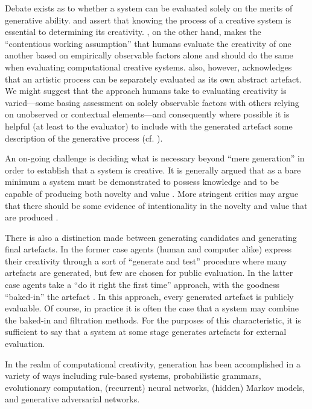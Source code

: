 \documentclass[phd,electronic,oneside,twosidetoc,letterpaper,chaptercenter,parttop,lol,lof,lot]{byumsphd}
\begin{document}
Debate exists as to whether a system can be evaluated solely on the merits of generative ability. \cite{Boden2003TheEdition} and \cite{kasof1995explaining} assert that knowing the process of a creative system is essential to determining its creativity. \citet{Ritchie2007}, on the other hand, makes the ``contentious working assumption'' that humans evaluate the creativity of one another based on empirically observable factors alone and should do the same when evaluating computational creative systems. \citeauthor{Ritchie2007} also, however, acknowledges that an artistic process can be separately evaluated as its own abstract artefact. We might suggest that the approach humans take to evaluating creativity is varied---some basing assessment on solely observable factors with others relying on unobserved or contextual elements---and consequently where possible it is helpful (at least to the evaluator) to include with the generated artefact some description of the generative process (cf. \cite{Colton2008CreativitySystems}).

An on-going challenge is deciding what is necessary beyond ``mere generation'' in order to establish that a system is creative. It is generally argued that as a bare minimum a system must be demonstrated to possess knowledge and to be capable of producing both novelty and value \citep{Boden2003TheEdition}. More stringent critics may argue that there should be some evidence of intentionality in the novelty and value that are produced \citep{Ventura2017HowSystem}.

There is also a distinction made between generating candidates and generating final artefacts. In the former case agents (human and computer alike) express their creativity through a sort of ``generate and test'' procedure where many artefacts are generated, but few are chosen for public evaluation. In the latter case agents take a ``do it right the first time'' approach, with the goodness ``baked-in'' the artefact \citep{Ventura2016}. In this approach, every generated artefact is publicly evaluable. Of course, in practice it is often the case that a system may combine the baked-in and filtration methods. For the purposes of this characteristic, it is sufficient to say that a system at some stage generates artefacts for external evaluation.

In the realm of computational creativity, generation has been accomplished in a variety of ways including rule-based systems, probabilistic grammars, evolutionary computation, (recurrent) neural networks, (hidden) Markov models, and generative adversarial networks.
\end{document}
